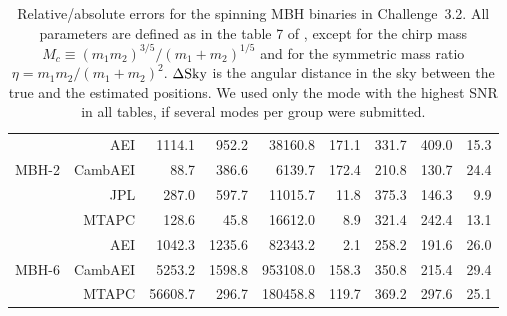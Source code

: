 \documentclass{iopart}
\begin{document}
\begin{table}
\begin{center}
\begin{tabular}{lr|rrrrrrr}
\hline
                & AEI            & 1114.1 & 952.2 & 38160.8 & 171.1 & 331.7 & 409.0 &  15.3 \\
MBH-2   & CambAEI &      88.7 & 386.6 &   6139.7 & 172.4 & 210.8 & 130.7 &  24.4  \\
                & JPL           &   287.0 & 597.7 & 11015.7 &   11.8 & 375.3 & 146.3 &    9.9 \\
                & MTAPC    &   128.6 &   45.8 & 16612.0 &      8.9 & 321.4 & 242.4 &  13.1  \\

\hline
                & AEI            &    1042.3 & 1235.6 &   82343.2 &      2.1 & 258.2 & 191.6 & 26.0  \\
MBH-6   & CambAEI &    5253.2 & 1598.8 & 953108.0 & 158.3 & 350.8 & 215.4 & 29.4  \\
                & MTAPC    & 56608.7 &    296.7 & 180458.8 & 119.7 & 369.2 & 297.6 & 25.1  \\


\hline
\end{tabular}
\end{center}
\caption{ Relative/absolute errors for the spinning MBH binaries in Challenge~3.2. All parameters are defined as in the table 7 of \cite{MLDC3}, except for the chirp mass $M_c \equiv (m_1 m_2)^{3/5} / (m_1 + m_2)^{1/5}$ and for the symmetric mass ratio $\eta = m_1 m_2 / (m_1 + m_2)^{2}$.  $ \Delta \textmd{Sky}$ is the angular distance in the sky between 
the true and the estimated positions. We used only the mode with the highest SNR in all tables, if several modes per group were submitted.
\label{tab:SMBH_Err}}
\end{table} 
\end{document}
